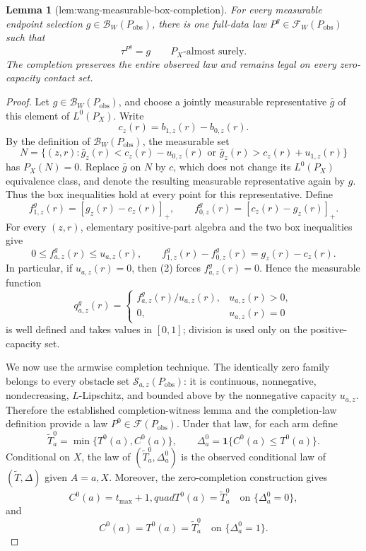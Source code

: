 \documentclass{article}
\newtheorem{lemma}{Lemma}
\begin{document}
\begin{lemma}[lem:wang-measurable-box-completion]\label{lem:wang-measurable-box-completion}
For every measurable endpoint selection \(g\in\mathcal B_W(P_{\mathrm{obs}})\), there is one full-data law \(P^g\in\mathcal F_W(P_{\mathrm{obs}})\) such that
\[
\tau^{P^g}=g\qquad P_X\text{-almost surely}.
\]
The completion preserves the entire observed law and remains legal on every zero-capacity contact set.
\end{lemma}
\begin{proof}
Let \(g\in\mathcal B_W(P_{\mathrm{obs}})\), and choose a jointly measurable representative \(\bar g\) of this element of \(L^0(P_X)\).  Write
\[
c_z(r)=b_{1,z}(r)-b_{0,z}(r).
\]
By the definition of \(\mathcal B_W(P_{\mathrm{obs}})\), the measurable set
\[
N=\{(z,r):\bar g_z(r)<c_z(r)-u_{0,z}(r)\text{ or }\bar g_z(r)>c_z(r)+u_{1,z}(r)\}
\]
has \(P_X(N)=0\).  Replace \(\bar g\) on \(N\) by \(c\), which does not change its \(L^0(P_X)\) equivalence class, and denote the resulting measurable representative again by \(g\).  Thus the box inequalities hold at every point for this representative.  Define
\[
f^g_{1,z}(r)=[g_z(r)-c_z(r)]_+,
\qquad
f^g_{0,z}(r)=[c_z(r)-g_z(r)]_+.
\tag{1}
\]
For every \((z,r)\), elementary positive-part algebra and the two box inequalities give
\[
0\le f^g_{a,z}(r)\le u_{a,z}(r),
\qquad
f^g_{1,z}(r)-f^g_{0,z}(r)=g_z(r)-c_z(r).
\tag{2}
\]
In particular, if \(u_{a,z}(r)=0\), then (2) forces \(f^g_{a,z}(r)=0\).  Hence the measurable function
\[
q^g_{a,z}(r)=
\begin{cases}
f^g_{a,z}(r)/u_{a,z}(r),&u_{a,z}(r)>0,\\
0,&u_{a,z}(r)=0
\end{cases}
\tag{3}
\]
is well defined and takes values in \([0,1]\); division is used only on the positive-capacity set.

We now use the armwise completion technique.  The identically zero family belongs to every obstacle set \(\mathcal S_{a,z}(P_{\mathrm{obs}})\): it is continuous, nonnegative, nondecreasing, \(L\)-Lipschitz, and bounded above by the nonnegative capacity \(u_{a,z}\).  Therefore the established completion-witness lemma and the completion-law definition provide a law \(P^0\in\mathcal F(P_{\mathrm{obs}})\).  Under that law, for each arm define
\[
\widetilde T_a^0=\min\{T^0(a),C^0(a)\},
\qquad
\Delta_a^0=\mathbf 1\{C^0(a)\le T^0(a)\}.
\tag{4}
\]
Conditional on \(X\), the law of \((\widetilde T_a^0,\Delta_a^0)\) is the observed conditional law of \((\widetilde T,\Delta)\) given \(A=a,X\).  Moreover, the zero-completion construction gives
\[
C^0(a)=t_{\max}+1,quad T^0(a)=\widetilde T_a^0
\quad\text{on }\{\Delta_a^0=0\},
\]
and
\[
C^0(a)=T^0(a)=\widetilde T_a^0
\quad\text{on }\{\Delta_a^0=1\}.
\tag{5}
\]


\end{proof}
\end{document}
